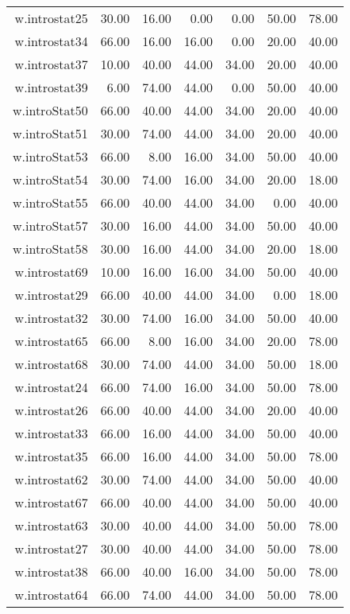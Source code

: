 \documentclass[12pt,english,nohyper]{tufte-handout}\usepackage[]{graphicx}\usepackage[]{color}
\begin{document}
\begin{longtable}{rrrrrrr}
  w.introstat25 & 30.00 & 16.00 & 0.00 & 0.00 & 50.00 & 78.00 \\ 
  w.introstat34 & 66.00 & 16.00 & 16.00 & 0.00 & 20.00 & 40.00 \\ 
  w.introstat37 & 10.00 & 40.00 & 44.00 & 34.00 & 20.00 & 40.00 \\ 
  w.introstat39 & 6.00 & 74.00 & 44.00 & 0.00 & 50.00 & 40.00 \\ 
  w.introStat50 & 66.00 & 40.00 & 44.00 & 34.00 & 20.00 & 40.00 \\ 
  w.introStat51 & 30.00 & 74.00 & 44.00 & 34.00 & 20.00 & 40.00 \\ 
  w.introStat53 & 66.00 & 8.00 & 16.00 & 34.00 & 50.00 & 40.00 \\ 
  w.introStat54 & 30.00 & 74.00 & 16.00 & 34.00 & 20.00 & 18.00 \\ 
  w.introStat55 & 66.00 & 40.00 & 44.00 & 34.00 & 0.00 & 40.00 \\ 
  w.introStat57 & 30.00 & 16.00 & 44.00 & 34.00 & 50.00 & 40.00 \\ 
  w.introStat58 & 30.00 & 16.00 & 44.00 & 34.00 & 20.00 & 18.00 \\ 
  w.introstat69 & 10.00 & 16.00 & 16.00 & 34.00 & 50.00 & 40.00 \\ 
  w.introstat29 & 66.00 & 40.00 & 44.00 & 34.00 & 0.00 & 18.00 \\ 
  w.introstat32 & 30.00 & 74.00 & 16.00 & 34.00 & 50.00 & 40.00 \\ 
  w.introstat65 & 66.00 & 8.00 & 16.00 & 34.00 & 20.00 & 78.00 \\ 
  w.introstat68 & 30.00 & 74.00 & 44.00 & 34.00 & 50.00 & 18.00 \\ 
  w.introstat24 & 66.00 & 74.00 & 16.00 & 34.00 & 50.00 & 78.00 \\ 
  w.introstat26 & 66.00 & 40.00 & 44.00 & 34.00 & 20.00 & 40.00 \\ 
  w.introstat33 & 66.00 & 16.00 & 44.00 & 34.00 & 50.00 & 40.00 \\ 
  w.introstat35 & 66.00 & 16.00 & 44.00 & 34.00 & 50.00 & 78.00 \\ 
  w.introstat62 & 30.00 & 74.00 & 44.00 & 34.00 & 50.00 & 40.00 \\ 
  w.introstat67 & 66.00 & 40.00 & 44.00 & 34.00 & 50.00 & 40.00 \\ 
  w.introstat63 & 30.00 & 40.00 & 44.00 & 34.00 & 50.00 & 78.00 \\ 
  w.introstat27 & 30.00 & 40.00 & 44.00 & 34.00 & 50.00 & 78.00 \\ 
  w.introstat38 & 66.00 & 40.00 & 16.00 & 34.00 & 50.00 & 78.00 \\ 
  w.introstat64 & 66.00 & 74.00 & 44.00 & 34.00 & 50.00 & 78.00 \\ 
   \hline
\hline
\end{longtable}
\end{document}
